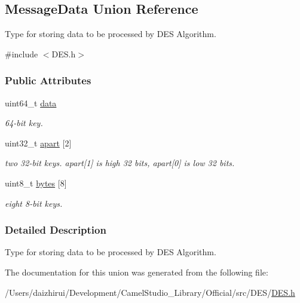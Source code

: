 \hypertarget{a00194}{}\subsection{Message\+Data Union Reference}
\label{a00194}


Type for storing data to be processed by D\+ES Algorithm.  




{\ttfamily \#include $<$D\+E\+S.\+h$>$}

\subsubsection*{Public Attributes}
\begin{DoxyCompactItemize}
\item 
\mbox{\label{a00194_a2cf9dd28d0679205048930fe98fa116b}} 
uint64\+\_\+t \mbox{\hyperlink{a00194_a2cf9dd28d0679205048930fe98fa116b}{data}}
\begin{DoxyCompactList}\small\item\em 64-\/bit key. \end{DoxyCompactList}\item 
\mbox{\label{a00194_a43406dd2e72f1230b8f70551a96699c5}} 
uint32\+\_\+t \mbox{\hyperlink{a00194_a43406dd2e72f1230b8f70551a96699c5}{apart}} \mbox{[}2\mbox{]}
\begin{DoxyCompactList}\small\item\em two 32-\/bit keys. apart\mbox{[}1\mbox{]} is high 32 bits, apart\mbox{[}0\mbox{]} is low 32 bits. \end{DoxyCompactList}\item 
\mbox{\label{a00194_aaceaebf6f0349dae52e2c1c2a462b654}} 
uint8\+\_\+t \mbox{\hyperlink{a00194_aaceaebf6f0349dae52e2c1c2a462b654}{bytes}} \mbox{[}8\mbox{]}
\begin{DoxyCompactList}\small\item\em eight 8-\/bit keys. \end{DoxyCompactList}\end{DoxyCompactItemize}


\subsubsection{Detailed Description}
Type for storing data to be processed by D\+ES Algorithm. 

The documentation for this union was generated from the following file\+:\begin{DoxyCompactItemize}
\item 
/\+Users/daizhirui/\+Development/\+Camel\+Studio\+\_\+\+Library/\+Official/src/\+D\+E\+S/\mbox{\hyperlink{a00026}{D\+E\+S.\+h}}\end{DoxyCompactItemize}
